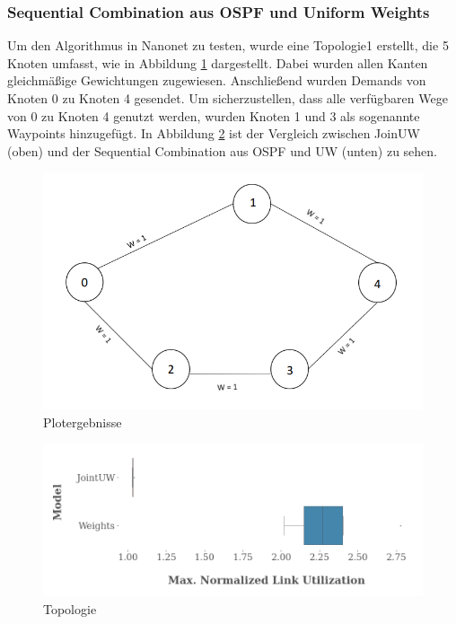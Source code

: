 \documentclass[sigconf, nonacm, review]{acmart}
\begin{document}
\subsubsection{Sequential Combination aus OSPF und Uniform Weights}
Um den Algorithmus in Nanonet zu testen, wurde eine Topologie1 erstellt, 
die 5 Knoten umfasst, wie in Abbildung \ref{fig:naveed_p2_graph} dargestellt. 
Dabei wurden allen Kanten gleichm\"a\ss ige Gewichtungen zugewiesen. 
Anschlie\ss end wurden Demands von Knoten 0 zu Knoten 4 gesendet. 
Um sicherzustellen, dass alle verf\"ugbaren Wege von 0 zu Knoten 4  genutzt werden,
wurden Knoten 1 und 3 als sogenannte Waypoints hinzugef\"ugt.
In Abbildung \ref{fig:naveed_p2_boxplot} ist der Vergleich zwischen JoinUW (oben) und der Sequential Combination aus OSPF und UW (unten) zu sehen.
\begin{figure}
\centering
\includegraphics[width=\linewidth]{figures/naveed_p2_graph.png}
\caption{Plotergebnisse}
\label{fig:naveed_p2_graph}
\end{figure}
\begin{figure}
\centering
\includegraphics[width=\linewidth]{figures/naveed_p2_boxplot.png}
\caption{Topologie}
\label{fig:naveed_p2_boxplot}
\end{figure}
\end{document}
